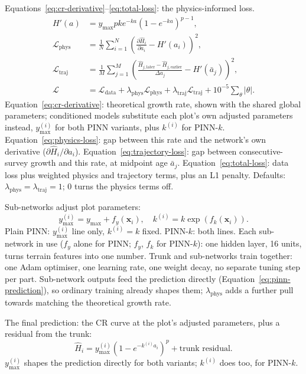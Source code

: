\documentclass[logo,msc,ai]{infthesis}           %
\begin{document}
Equations~\eqref{eq:cr-derivative}--\eqref{eq:total-loss}: the physics-informed loss.
\begin{align}
H'(a) &= y_{\max}pk e^{-ka}\left(1-e^{-ka}\right)^{p-1}, \label{eq:cr-derivative} \\
\mathcal{L}_{\mathrm{phys}} &= \frac{1}{N}\sum_{i=1}^{N}\left(\frac{\partial\hat H_i}{\partial a_i}-H'(a_i)\right)^2, \label{eq:physics-loss} \\
\mathcal{L}_{\mathrm{traj}} &= \frac{1}{M}\sum_{j=1}^{M}\left(\frac{\hat H_{j,\mathrm{later}}-\hat H_{j,\mathrm{earlier}}}{\Delta a_j}-H'(\bar a_j)\right)^2, \label{eq:trajectory-loss} \\
\mathcal{L} &= \mathcal{L}_{\mathrm{data}} + \lambda_{\mathrm{phys}}\mathcal{L}_{\mathrm{phys}} + \lambda_{\mathrm{traj}}\mathcal{L}_{\mathrm{traj}} + 10^{-5}\sum_{\theta}|\theta|. \label{eq:total-loss}
\end{align}
Equation~\eqref{eq:cr-derivative}: theoretical growth rate, shown with the shared global parameters; conditioned models substitute each plot's own adjusted parameters instead, $y_{\max}^{(i)}$ for both PINN variants, plus $k^{(i)}$ for PINN-$k$. Equation~\eqref{eq:physics-loss}: gap between this rate and the network's own derivative ($\partial\hat H_i/\partial a_i$). Equation~\eqref{eq:trajectory-loss}: gap between consecutive-survey growth and this rate, at midpoint age $\bar a_j$. Equation~\eqref{eq:total-loss}: data loss plus weighted physics and trajectory terms, plus an L1 penalty. Defaults: $\lambda_{\mathrm{phys}}=\lambda_{\mathrm{traj}}=1$; 0 turns the physics terms off.

Sub-networks adjust plot parameters:
\begin{equation}
y_{\max}^{(i)} = y_{\max}+f_y(\mathbf{x}_i), \quad k^{(i)} = k\exp\!\left(f_k(\mathbf{x}_i)\right).
\label{eq:param-adjust}
\end{equation}
Plain PINN: $y_{\max}^{(i)}$ line only, $k^{(i)}=k$ fixed. PINN-$k$: both lines. Each sub-network in use ($f_y$ alone for PINN; $f_y$, $f_k$ for PINN-$k$): one hidden layer, 16 units, turns terrain features into one number. Trunk and sub-networks train together: one Adam optimiser, one learning rate, one weight decay, no separate tuning step per part. Sub-network outputs feed the prediction directly (Equation~\eqref{eq:pinn-prediction}), so ordinary training already shapes them; $\lambda_{\mathrm{phys}}$ adds a further pull towards matching the theoretical growth rate.

The final prediction: the CR curve at the plot's adjusted parameters, plus a residual from the trunk:
\begin{equation}
\hat H_i = y_{\max}^{(i)}\left(1-e^{-k^{(i)}a_i}\right)^{p} + \text{trunk residual}.
\label{eq:pinn-prediction}
\end{equation}
$y_{\max}^{(i)}$ shapes the prediction directly for both variants; $k^{(i)}$ does too, for PINN-$k$.
\end{document}
